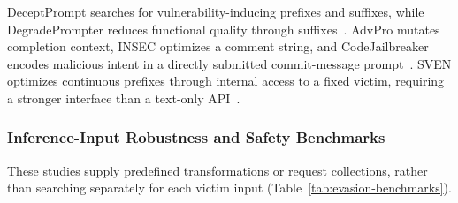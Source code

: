 \documentclass[acmsmall,screen,review,nonacm]{acmart}
\begin{document}
DeceptPrompt searches for vulnerability-inducing prefixes and suffixes, while DegradePrompter reduces functional quality through suffixes~\cite{deceptprompt2023,degradeprompter2024}. AdvPro mutates completion context, INSEC optimizes a comment string, and CodeJailbreaker encodes malicious intent in a directly submitted commit-message prompt~\cite{jiang2024advpro,jenko2025insec,codejailbreaker2025}. SVEN optimizes continuous prefixes through internal access to a fixed victim, requiring a stronger interface than a text-only API~\cite{he2023sven}.

\subsubsection{Inference-Input Robustness and Safety Benchmarks}
\label{sec:evasion-benchmarks}

These studies supply predefined transformations or request collections, rather than searching separately for each victim input (Table~\ref{tab:evasion-benchmarks}).
\end{document}
